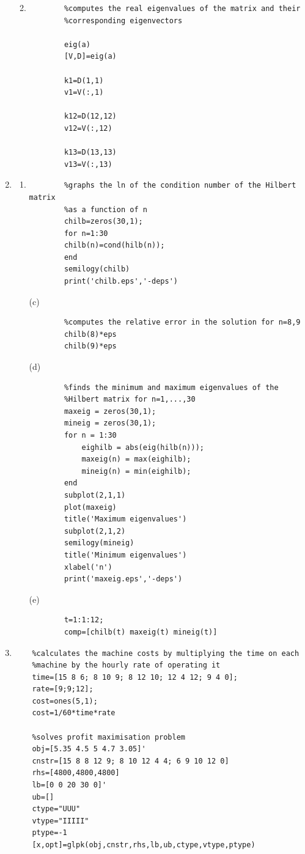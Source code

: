 \documentclass[11pt,a4paper]{article}
\begin{document}
\begin{enumerate}
\begin{enumerate}
	\pagebreak
	
	\item	
	\begin{verbatim}
		%computes the real eigenvalues of the matrix and their
		%corresponding eigenvectors
		
		eig(a)
		[V,D]=eig(a)
		
		k1=D(1,1)
		v1=V(:,1)

		k12=D(12,12)
		v12=V(:,12)

		k13=D(13,13)
		v13=V(:,13)
	\end{verbatim}
	
\end{enumerate}

\item
\begin{enumerate}
	\item
	\begin{verbatim}
		%graphs the ln of the condition number of the Hilbert matrix 
		%as a function of n
		chilb=zeros(30,1);
		for n=1:30
		chilb(n)=cond(hilb(n));
		end
		semilogy(chilb)
		print('chilb.eps','-deps')
	\end{verbatim}
	
	\item[(c)]
	\begin{verbatim}
		%computes the relative error in the solution for n=8,9
		chilb(8)*eps
		chilb(9)*eps
	\end{verbatim}
	
	\item[(d)]
	\begin{verbatim}
		%finds the minimum and maximum eigenvalues of the
		%Hilbert matrix for n=1,...,30
		maxeig = zeros(30,1);
		mineig = zeros(30,1);
		for n = 1:30
			eighilb = abs(eig(hilb(n)));
			maxeig(n) = max(eighilb);
			mineig(n) = min(eighilb);
		end
		subplot(2,1,1)
		plot(maxeig)
		title('Maximum eigenvalues')
		subplot(2,1,2)
		semilogy(mineig)
		title('Minimum eigenvalues')
		xlabel('n')
		print('maxeig.eps','-deps')
	\end{verbatim}
	
	\pagebreak
	
	\item[(e)]
	\begin{verbatim}
		t=1:1:12;
		comp=[chilb(t) maxeig(t) mineig(t)]
	\end{verbatim}
	
\end{enumerate}

\item
\begin{verbatim}
	%calculates the machine costs by multiplying the time on each
	%machine by the hourly rate of operating it
	time=[15 8 6; 8 10 9; 8 12 10; 12 4 12; 9 4 0];
	rate=[9;9;12];
	cost=ones(5,1);
	cost=1/60*time*rate
	
	%solves profit maximisation problem
	obj=[5.35 4.5 5 4.7 3.05]'
	cnstr=[15 8 8 12 9; 8 10 12 4 4; 6 9 10 12 0]
	rhs=[4800,4800,4800]
	lb=[0 0 20 30 0]'
	ub=[]
	ctype="UUU"
	vtype="IIIII"
	ptype=-1
	[x,opt]=glpk(obj,cnstr,rhs,lb,ub,ctype,vtype,ptype)
\end{verbatim}
	
\end{enumerate}
\end{document}
